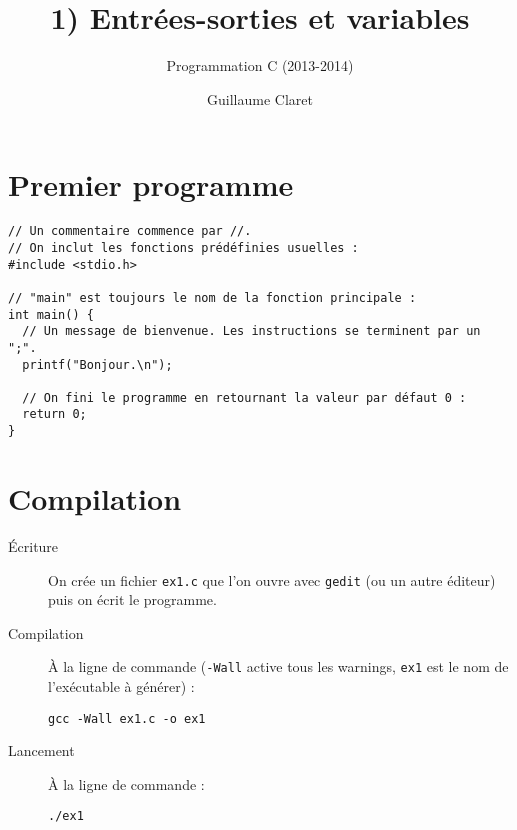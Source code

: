 \documentclass[a4paper,10pt]{article}
\begin{document}
  \title{1) Entrées-sorties et variables}
  \author{Programmation C (2013-2014)}
  \date{Guillaume Claret}
  \maketitle
  
  \section{Premier programme}
  \begin{verbatim}
// Un commentaire commence par //.
// On inclut les fonctions prédéfinies usuelles :
#include <stdio.h>

// "main" est toujours le nom de la fonction principale :
int main() {
  // Un message de bienvenue. Les instructions se terminent par un ";".
  printf("Bonjour.\n");
  
  // On fini le programme en retournant la valeur par défaut 0 :
  return 0;
}
  \end{verbatim}
  
  \section{Compilation}
  \begin{description}
    \item[Écriture] On crée un fichier \texttt{ex1.c} que l'on ouvre avec \texttt{gedit} (ou un autre éditeur) puis on écrit le programme.
    \item[Compilation] À la ligne de commande (\texttt{-Wall} active tous les warnings, \texttt{ex1} est le nom de l'exécutable à générer) :
      \begin{verbatim}
gcc -Wall ex1.c -o ex1
      \end{verbatim}
    \item[Lancement] À la ligne de commande :
      \begin{verbatim}
./ex1
      \end{verbatim}
  \end{description}
  
\end{document}
